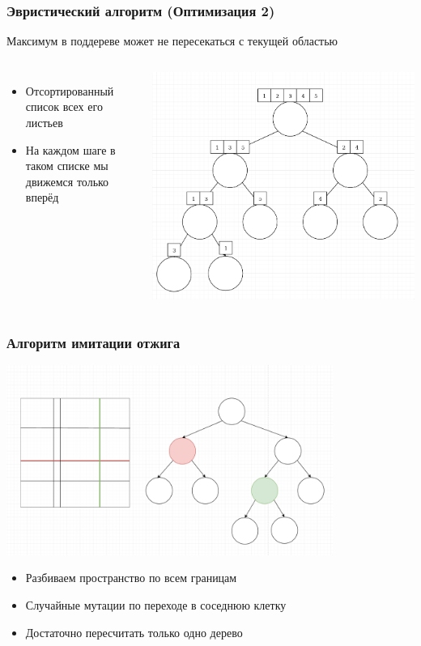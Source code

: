 \documentclass{beamer}
\begin{document}
\begin{frame} \frametitle{Эвристический алгоритм (Оптимизация 2)}
    Максимум в поддереве может не пересекаться с текущей областью

    \begin{columns}
            \begin{itemize}
                \item Отсортированный список всех его листьев
                \item На каждом шаге в таком списке мы движемся только вперёд
            \end{itemize}
            \includegraphics[width=1.1\textwidth]{merge.png}
    \end{columns}
\end{frame}

\begin{frame} \frametitle{Алгоритм имитации отжига}
    \begin{center}
    \includegraphics[width=0.8\textwidth]{gena.png}
    \end{center}
    \begin{itemize}
        \item Разбиваем пространство по всем границам
        \item Случайные мутации по переходе в соседнюю клетку
        \item Достаточно пересчитать только одно дерево
    \end{itemize}
\end{frame}
\end{document}
